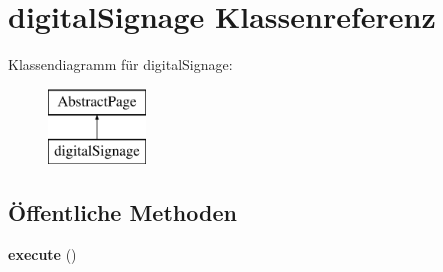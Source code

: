 \hypertarget{classdigital_signage}{}\section{digital\+Signage Klassenreferenz}
\label{classdigital_signage}
Klassendiagramm für digital\+Signage\+:\begin{figure}[H]
\begin{center}
\leavevmode
\includegraphics[height=2.000000cm]{classdigital_signage}
\end{center}
\end{figure}
\subsection*{Öffentliche Methoden}
\begin{DoxyCompactItemize}
\item 
\mbox{\label{classdigital_signage_aae7e013533b600512bdb2ae01891911e}} 
{\bfseries execute} ()
\end{DoxyCompactItemize}

